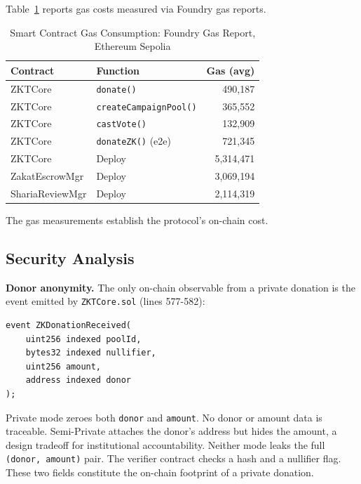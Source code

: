 \documentclass[conference]{IEEEtran}
\begin{document}
Table~\ref{tab:gas} reports gas costs measured via Foundry gas reports.

\begin{table}[htbp]
\caption{Smart Contract Gas Consumption: Foundry Gas Report, Ethereum Sepolia}
\label{tab:gas}
\footnotesize
\setlength{\tabcolsep}{3pt}
\begin{center}
\begin{tabular}{|l|l|r|}
\hline
\textbf{Contract} & \textbf{Function} & \textbf{Gas (avg)} \\
\hline
ZKTCore              & \texttt{donate()}                 & 490,187 \\
ZKTCore              & \texttt{createCampaignPool()}     & 365,552 \\
ZKTCore              & \texttt{castVote()}               & 132,909 \\
ZKTCore              & \texttt{donateZK()} (e2e)          & 721,345 \\
\hline
ZKTCore              & Deploy                            & 5,314,471 \\
ZakatEscrowMgr       & Deploy                            & 3,069,194 \\
ShariaReviewMgr      & Deploy                            & 2,114,319 \\
\hline
\end{tabular}
\end{center}
\end{table}

The gas measurements establish the protocol's on-chain cost.

\subsection{Security Analysis}

\textbf{Donor anonymity.} The only on-chain observable from a private donation is the event emitted by \texttt{ZKTCore.sol} (lines 577-582):

\begin{verbatim}
event ZKDonationReceived(
    uint256 indexed poolId,
    bytes32 indexed nullifier,
    uint256 amount,
    address indexed donor
);
\end{verbatim}

Private mode zeroes both \texttt{donor} and \texttt{amount}. No donor or amount data is traceable. Semi-Private attaches the donor's address but hides the amount, a design tradeoff for institutional accountability. Neither mode leaks the full \texttt{(donor, amount)} pair. The verifier contract checks a hash and a nullifier flag. These two fields constitute the on-chain footprint of a private donation.
\end{document}
